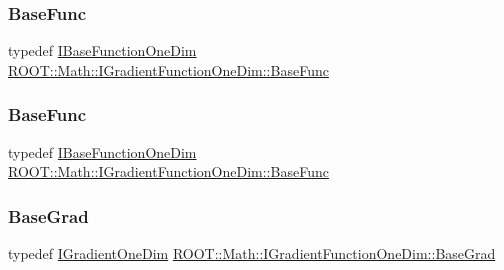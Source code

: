 \subsubsection{\texorpdfstring{BaseFunc}{BaseFunc}\hspace{0.1cm}{\footnotesize\ttfamily [2/3]}}
{\footnotesize\ttfamily typedef \mbox{\hyperlink{classROOT_1_1Math_1_1IBaseFunctionOneDim}{I\+Base\+Function\+One\+Dim}} \mbox{\hyperlink{classROOT_1_1Math_1_1IGradientFunctionOneDim_a9eae6bcbeb2d0396937710bd70bd29d0}{R\+O\+O\+T\+::\+Math\+::\+I\+Gradient\+Function\+One\+Dim\+::\+Base\+Func}}}

\mbox{\label{classROOT_1_1Math_1_1IGradientFunctionOneDim_a9eae6bcbeb2d0396937710bd70bd29d0}} 
\subsubsection{\texorpdfstring{BaseFunc}{BaseFunc}\hspace{0.1cm}{\footnotesize\ttfamily [3/3]}}
{\footnotesize\ttfamily typedef \mbox{\hyperlink{classROOT_1_1Math_1_1IBaseFunctionOneDim}{I\+Base\+Function\+One\+Dim}} \mbox{\hyperlink{classROOT_1_1Math_1_1IGradientFunctionOneDim_a9eae6bcbeb2d0396937710bd70bd29d0}{R\+O\+O\+T\+::\+Math\+::\+I\+Gradient\+Function\+One\+Dim\+::\+Base\+Func}}}

\mbox{\label{classROOT_1_1Math_1_1IGradientFunctionOneDim_ab15a5262f99475c3633de251f75fbd3f}} 
\subsubsection{\texorpdfstring{BaseGrad}{BaseGrad}\hspace{0.1cm}{\footnotesize\ttfamily [1/3]}}
{\footnotesize\ttfamily typedef \mbox{\hyperlink{classROOT_1_1Math_1_1IGradientOneDim}{I\+Gradient\+One\+Dim}} \mbox{\hyperlink{classROOT_1_1Math_1_1IGradientFunctionOneDim_ab15a5262f99475c3633de251f75fbd3f}{R\+O\+O\+T\+::\+Math\+::\+I\+Gradient\+Function\+One\+Dim\+::\+Base\+Grad}}}

